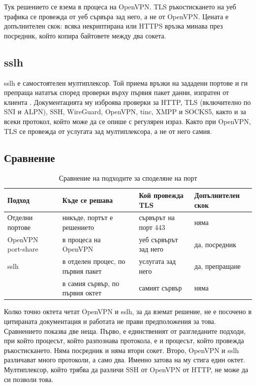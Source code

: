 Тук решението се взема в процеса на OpenVPN. TLS ръкостискането на уеб трафика се
провежда от уеб сървъра зад него, а не от OpenVPN. Цената е допълнителен скок: всяка
некриптирана или HTTPS връзка минава през посредник, който копира байтовете между два
сокета.

\subsection{sslh}

sslh е самостоятелен мултиплексор. Той приема връзки на зададени портове и ги препраща
нататък според проверки върху първия пакет данни, изпратен от клиента \cite{sslh}.
Документацията му изброява проверки за HTTP, TLS (включително по SNI и ALPN), SSH,
WireGuard, OpenVPN, tinc, XMPP и SOCKS5, както и за всеки протокол, който може да се
опише с регулярен израз. Както при OpenVPN, TLS се провежда от услугата зад
мултиплексора, а не от него самия.

\subsection{Сравнение}

\begin{table}[H]
\centering
\caption{Сравнение на подходите за споделяне на порт}
\label{tab:sharing}
\begin{tabularx}{\textwidth}{@{}L{2.9cm}YYY@{}}
\toprule
Подход & Къде се решава & Кой провежда TLS & Допълнителен скок \\
\midrule
Отделни портове & никъде, портът е решението & сървърът на порт 443 & няма \\
OpenVPN port-share & в процеса на OpenVPN & уеб сървърът зад него & да, посредник \\
sslh & в отделен процес, по първия пакет & услугата зад него & да, препращане \\
 & в самия сървър, по първия октет & самият сървър & няма \\
\bottomrule
\end{tabularx}
\end{table}

Колко точно октета четат OpenVPN и sslh, за да вземат решение, не е посочено в цитираната
документация и работата не прави предположения за това. Сравнението показва две неща.
Първо,  е единственият от разгледаните подходи, при който процесът, който
разпознава протокола, е и процесът, който провежда ръкостискането. Няма посредник и
няма втори сокет. Второ, OpenVPN и sslh различават много протоколи, а  само
два. Именно затова на  му стига един октет. Мултиплексор, който трябва да
различи SSH от OpenVPN от HTTP, не може да си позволи това.
